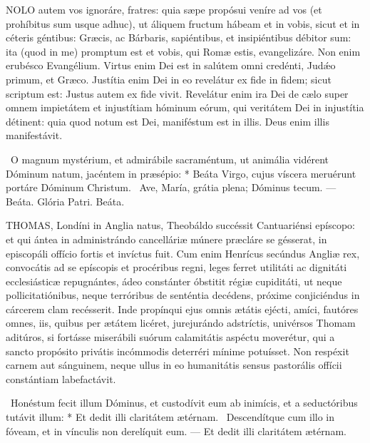 
\lettrine[lines=2]{N}{OLO} autem vos ignoráre, fratres: quia sæpe propósui veníre ad vos (et prohíbitus sum usque adhuc), ut áliquem fructum hábeam et in vobis, sicut et in céteris géntibus: Græcis, ac Bárbaris, sapiéntibus, et insipiéntibus débitor sum: ita (quod in me) promptum est et vobis, qui Romæ estis, evangelizáre. Non enim erubésco Evangélium. Virtus enim Dei est in salútem omni credénti, Judǽo primum, et Græco. Justítia enim Dei in eo revelátur ex fide in fidem; sicut scriptum est: Justus autem ex fide vivit. Revelátur enim ira Dei de cælo super omnem impietátem et injustítiam hóminum eórum, qui veritátem Dei in injustítia détinent: quia quod notum est Dei, maniféstum est in illis. Deus enim illis manifestávit.

\R\ O magnum mystérium, et admirábile sacraméntum, ut animália vidérent Dóminum natum, jacéntem in præsépio: * Beáta Virgo, cujus víscera meruérunt portáre Dóminum Christum. \V\ Ave, María, grátia plena; Dóminus tecum. --- Beáta. Glória Patri. Beáta.



\lettrine[lines=2]{T}{HOMAS}, Londíni in Anglia natus, Theobáldo succéssit Cantuariénsi epíscopo: et qui ántea in administrándo cancelláriæ múnere præcláre se gésserat, in episcopáli offício fortis et invíctus fuit. Cum enim Henrícus secúndus Angliæ rex, convocátis ad se epíscopis et procéribus regni, leges ferret utilitáti ac dignitáti ecclesiásticæ repugnántes, ádeo constánter óbstitit régiæ cupiditáti, ut neque pollicitatiónibus, neque terróribus de senténtia decédens, próxime conjiciéndus in cárcerem clam recésserit. Inde propínqui ejus omnis ætátis ejécti, amíci, fautóres omnes, iis, quibus per ætátem licéret, jurejurándo adstríctis, univérsos Thomam aditúros, si fortásse miserábili suórum calamitátis aspéctu moverétur, qui a sancto propósito privátis incómmodis deterréri mínime potuísset. Non respéxit carnem aut sánguinem, neque ullus in eo humanitátis sensus pastorális offícii constántiam labefactávit.

\R\ Honéstum fecit illum Dóminus, et custodívit eum ab inimícis, et a seductóribus tutávit illum: * Et dedit illi claritátem ætérnam. \V\ Descendítque cum illo in fóveam, et in vínculis non derelíquit eum. --- Et dedit illi claritátem ætérnam.


